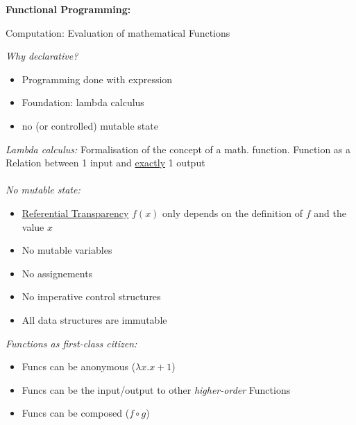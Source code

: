 \begin{breakbox}
\textbf{Functional Programming:}
\begin{mdframed}
  \begin{center}
  	Computation: Evaluation of mathematical Functions
  \end{center}
\end{mdframed}
\emph{Why declarative?}
\begin{itemize}
	\setlength{\itemsep}{0pt}
    \setlength{\parskip}{0pt}
    \setlength{\parsep}{0pt}
    \setlength{\itemindent}{-0.15in}
	\item Programming done with expression
	\item Foundation: lambda calculus
	\item no (or controlled) mutable state
\end{itemize}
\emph{Lambda calculus:} Formalisation of the concept of a math. function. Function as a Relation between 1 input and \underline{exactly} 1 output \\\\
\emph{No mutable state:}
\begin{itemize}
	\setlength{\itemsep}{0pt}
    \setlength{\parskip}{0pt}
    \setlength{\parsep}{0pt}
    \setlength{\itemindent}{-0.15in}
	\item \underline{Referential Transparency} $f(x)$ only depends on the definition of $f$ and the value $x$
	\item No mutable variables
	\item No assignements
	\item No imperative control structures
	\item All data structures are immutable
\end{itemize}
\emph{Functions as first-class citizen:}
\begin{itemize}
	\setlength{\itemsep}{0pt}
    \setlength{\parskip}{0pt}
    \setlength{\parsep}{0pt}
    \setlength{\itemindent}{-0.15in}
	\item Funcs can be anonymous ($\lambda x.x+1$)
	\item Funcs can be the input/output to other \emph{higher-order} Functions
	\item Funcs can be composed ($f \circ g$)
\end{itemize}
\end{breakbox}

